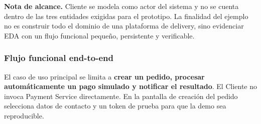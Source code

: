 \documentclass[12pt,a4paper]{article}
\begin{document}
\textbf{Nota de alcance.} Cliente se modela como actor del sistema y no se cuenta dentro de las tres entidades exigidas para el prototipo. La finalidad del ejemplo no es construir todo el dominio de una plataforma de delivery, sino evidenciar EDA con un flujo funcional pequeño, persistente y verificable.

\subsubsection{Flujo funcional end-to-end}

El caso de uso principal se limita a \textbf{crear un pedido, procesar automáticamente un pago simulado y notificar el resultado}. El Cliente no invoca Payment Service directamente. En la pantalla de creación del pedido selecciona datos de contacto y un token de prueba para que la demo sea reproducible.
\end{document}
